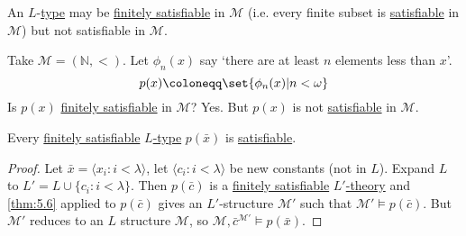 \documentclass{article}
\let\models\vDash
\newcommand{\named}[1]{\textbf{#1}\index{#1}}
\begin{document}
\begin{remark}
  An $L$-\hyperlink{def:type}{type} may be \hyperlink{def:type}{finitely satisfiable} in $\mathcal{M}$ (i.e. every finite subset is \hyperlink{def:type}{satisfiable} in $\mathcal{M}$) but not satisfiable in $\mathcal{M}$.
\end{remark}
\begin{eg}
  Take $\mathcal{M} = (\mathbb{N}, <)$. Let $\phi_n(x)$ say `there are at least $n$ elements less than $x$'.
  \begin{equation*}
    p(x) \coloneqq \set{\phi_n(x) | n < \omega}
  \end{equation*}
  Is $p(x)$ \hyperlink{def:type}{finitely satisfiable} in $\mathcal{M}$? Yes. But $p(x)$ is not \hyperlink{def:type}{satisfiable} in $\mathcal{M}$.
\end{eg}
\begin{nthm}\label{thm:5.8}
  Every \hyperlink{def:type}{finitely satisfiable} \hyperlink{def:type}{$L$-type} $p(\bar{x})$ is \hyperlink{def:type}{satisfiable}.
\end{nthm}
\begin{proof}
  Let $\bar{x} = \langle x_i : i < \lambda \rangle$, let $\langle c_i : i < \lambda \rangle$ be new constants (not in $L$).
  Expand $L$ to $L' = L \cup \{c_i : i < \lambda\}$.
  Then $p(\bar{c})$ is a \hyperlink{def:fs}{finitely satisfiable} \hyperlink{def:ltheory}{$L'$-theory} and \cref{thm:5.6} applied to $p(\bar{c})$ gives an $L'$-structure $\mathcal{M}'$ such that $\mathcal{M}' \models p(\bar{c})$.
  But $\mathcal{M}'$ reduces to an $L$ structure $\mathcal{M}$, so $\mathcal{M}, \bar{c}^{\mathcal{M}'} \models p(\bar{x})$.
\end{proof}
\end{document}
